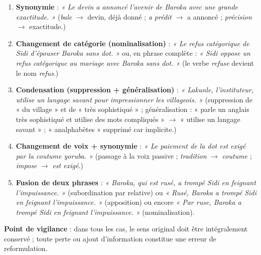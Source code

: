 \documentclass[11pt]{article}
\begin{document}
\begin{corrige}
\begin{enumerate}
    \item \textbf{Synonymie} : \emph{« Le devin a annoncé l'avenir de Baroka avec une grande exactitude. »} (\emph{bale} $\rightarrow$ devin, déjà donné ; \emph{a prédit} $\rightarrow$ a annoncé ; \emph{précision} $\rightarrow$ exactitude.)
    \item \textbf{Changement de catégorie (nominalisation)} : \emph{« Le refus catégorique de Sidi d'épouser Baroka sans dot. »} ou, en phrase complète : \emph{« Sidi oppose un refus catégorique au mariage avec Baroka sans dot. »} (le verbe \emph{refuse} devient le nom \emph{refus}.)
    \item \textbf{Condensation (suppression + généralisation)} : \emph{« Lakunle, l'instituteur, utilise un langage savant pour impressionner les villageois. »} (suppression de « du village » et de « très sophistiqué » ; généralisation : « parle un anglais très sophistiqué et utilise des mots compliqués » $\rightarrow$ « utilise un langage savant » ; « analphabètes » supprimé car implicite.)
    \item \textbf{Changement de voix + synonymie} : \emph{« Le paiement de la dot est exigé par la coutume yoruba. »} (passage à la voix passive ; \emph{tradition} $\rightarrow$ \emph{coutume} ; \emph{impose} $\rightarrow$ \emph{est exigé}.)
    \item \textbf{Fusion de deux phrases} : \emph{« Baroka, qui est rusé, a trompé Sidi en feignant l'impuissance. »} (subordination par relative) ou \emph{« Rusé, Baroka a trompé Sidi en feignant l'impuissance. »} (apposition) ou encore \emph{« Par ruse, Baroka a trompé Sidi en feignant l'impuissance. »} (nominalisation).
\end{enumerate}
\textbf{Point de vigilance} : dans tous les cas, le sens original doit être intégralement conservé ; toute perte ou ajout d'information constitue une erreur de reformulation.
\end{corrige}
\end{document}
